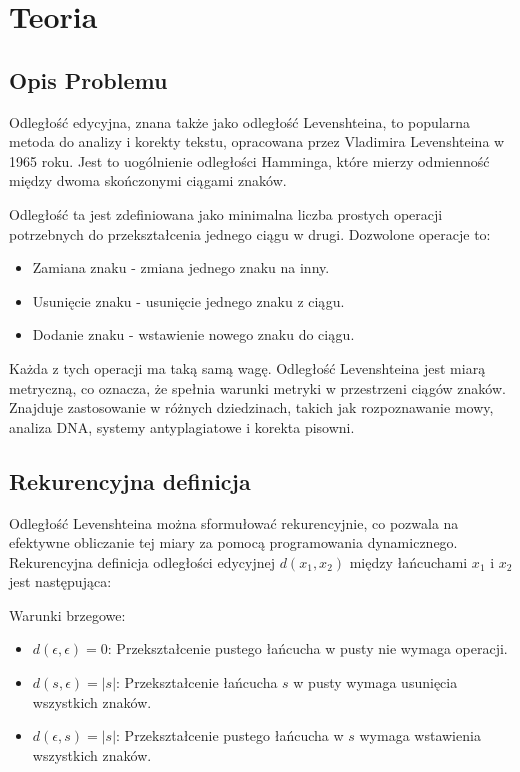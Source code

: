 \section{Teoria}
\subsection{Opis Problemu}
Odległość edycyjna, znana także jako odległość Levenshteina, to popularna metoda do analizy i korekty tekstu, opracowana przez Vladimira Levenshteina w 1965 roku\cite{levenshtein1966}. Jest to uogólnienie odległości Hamminga, które mierzy odmienność między dwoma skończonymi ciągami znaków.

\vspace{1em}

Odległość ta jest zdefiniowana jako minimalna liczba prostych operacji potrzebnych do przekształcenia jednego ciągu w drugi. Dozwolone operacje to:

\begin{itemize}
    \item Zamiana znaku - zmiana jednego znaku na inny.
    \item Usunięcie znaku - usunięcie jednego znaku z ciągu.
    \item Dodanie znaku - wstawienie nowego znaku do ciągu.
\end{itemize}

\vspace{1em}

Każda z tych operacji ma taką samą wagę. Odległość Levenshteina jest miarą metryczną, co oznacza, że spełnia warunki metryki w przestrzeni ciągów znaków. Znajduje zastosowanie w różnych dziedzinach, takich jak rozpoznawanie mowy, analiza DNA, systemy antyplagiatowe i korekta pisowni.

\subsection{Rekurencyjna definicja}
Odległość Levenshteina można sformułować rekurencyjnie, co pozwala na efektywne obliczanie tej miary za pomocą programowania dynamicznego. Rekurencyjna definicja odległości edycyjnej \(d(x_1, x_2)\) między łańcuchami \(x_1\) i \(x_2\) jest następująca:

\vspace{1em}

Warunki brzegowe:
\begin{itemize}
    \item \(d(\epsilon, \epsilon) = 0\): Przekształcenie pustego łańcucha w pusty nie wymaga operacji.
    \item \(d(s, \epsilon) = |s|\): Przekształcenie łańcucha \(s\) w pusty wymaga usunięcia wszystkich znaków.
    \item \(d(\epsilon, s) = |s|\): Przekształcenie pustego łańcucha w \(s\) wymaga wstawienia wszystkich znaków.
\end{itemize}

